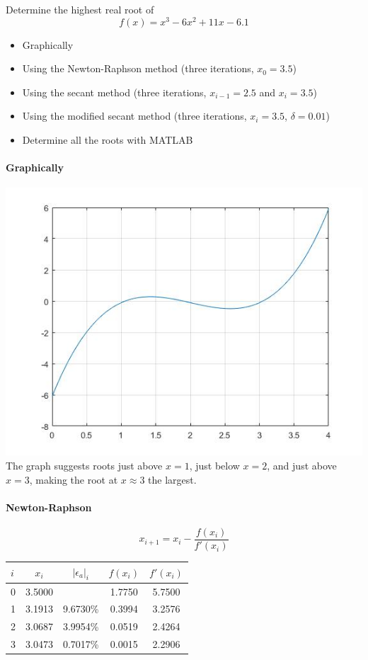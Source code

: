 \documentclass{article}
\begin{document}
\setcounter{problem}{2}
\begin{problem}
Determine the highest real root of
\[ f(x) = x^{3} - 6x^{2} + 11x - 6.1 \]
\begin{itemize}
\item Graphically
\item Using the Newton-Raphson method (three iterations, $x_{0}=3.5$)
\item Using the secant method (three iterations, $x_{i-1}=2.5$ and $x_{i}=3.5$)
\item Using the modified secant method (three iterations, $x_{i}=3.5$, $\delta = 0.01$)
\item Determine all the roots with MATLAB
\end{itemize}
\end{problem}

\paragraph{Graphically\\}
\includegraphics[width=\linewidth]{HW5-PolynomialGraph.jpg}
The graph suggests roots just above $x=1$, just below $x=2$, and just above $x=3$, making the root at $x\approx 3$ the largest.

\paragraph{Newton-Raphson}
\[ x_{i+1} = x_{i} - \frac{f(x_{i})}{f'(x_{i})} \]
\begin{center}
	\begin{tabular}{| l c c | c c |}
\hline
$i$	&	$x_{i}$	&	$| \epsilon_a |_{i}$	&	$f(x_{i})$	&	$f'(x_{i})$\\
\hline
0	&	3.5000	&							&	1.7750		&	5.7500\\ 
1	&	3.1913	&	9.6730\%				&	0.3994		&	3.2576\\ 
2	&	3.0687	&	3.9954\%				&	0.0519		&	2.4264\\ 
3	&	3.0473	&	0.7017\%				&	0.0015		&	2.2906\\
\hline
	\end{tabular}
\end{center}
\end{document}
